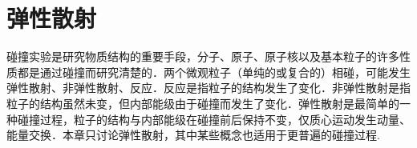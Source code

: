 \chapter{弹性散射}\label{chp:08}

碰撞实验是研究物质结构的重要手段，分子、原子、原子核以及基本粒子的许多性质都是通过碰撞而研究清楚的．两个微观粒子（单纯的或复合的）相碰，可能发生弹性散射、非弹性散射、反应．反应是指粒子的结构发生了变化．非弹性散射是指粒子的结构虽然未变，但内部能级由于碰撞而发生了变化．弹性散射是最简单的一种碰撞过程，粒子的结构与内部能级在碰撞前后保持不变，仅质心运动发生动量、能量交换．本章只讨论弹性散射，其中某些概念也适用于更普遍的碰撞过程.












